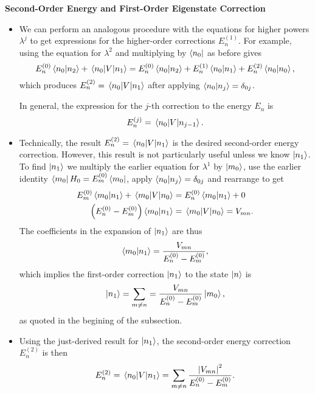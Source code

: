 \documentclass[11pt, a4paper]{article}
\begin{document}
\textbf{Second-Order Energy and First-Order Eigenstate Correction}
\begin{itemize}
     \item We can perform an analogous procedure with the equations for higher powers $ \lambda^{j} $ to get expressions for the higher-order corrections $ E_{n}^{(1)} $. For example, using the equation for $ \lambda^{2} $ and multiplying by $ \bra{n_{0}} $ as before gives
    \begin{equation*}
        E_{n}^{(0)} \braket{n_{0}}{n_{2}} + \mel{n_{0}}{V}{n_{1}} = E_{n}^{(0)}\braket{n_{0}}{n_{2}} + E_{n}^{(1)}\braket{n_{0}}{n_{1}} + E_{n}^{(2)}\braket{n_{0}}{n_{0}}, 
    \end{equation*}
    which produces $ E_{n}^{(2)} = \mel{n_{0}}{V}{n_{1}}$ after applying $ \braket{n_{0}}{n_{j}} = \delta_{0j} $. 

    In general, the expression for the $ j $-th correction to the energy $ E_{n} $ is
    \begin{equation*}
        E_{n}^{(j)} = \mel{n_{0}}{V}{n_{j-1}}.
    \end{equation*}
    
    \item Technically, the result $ E_{n}^{(2)} = \mel{n_{0}}{V}{n_{1}} $ is the desired second-order energy correction. However, this result is not particularly useful unless we know $ \ket{n_{1}} $. To find $ \ket{n_{1}} $ we multiply the earlier equation for $ \lambda^{1} $ by $ \ket{m_{0}} $, use the earlier identity $ \bra{m_{0}}H_{0} = E_{m}^{(0)}\bra{m_{0}} $, apply $ \braket{n_{0}}{n_{j}} = \delta_{0j} $ and rearrange to get
    \begin{align*}
        E_{m}^{(0)}\braket{m_{0}}{n_{1}} + \mel{m_{0}}{V}{n_{0}} &= E_{n}^{(0)} \braket{m_{0}}{n_{1}} + 0\\
        \left( E_{n}^{(0)} - E_{m}^{(0)} \right)\braket{m_{0}}{n_{1}} &= \mel{m_{0}}{V}{n_{0}} = V_{mn}.
    \end{align*}
    The coefficients in the expansion of $ \ket{n_{1}} $ are thus
    \begin{equation*}
        \braket{m_{0}}{n_{1}} = \frac{V_{mn}}{E_{n}^{(0)} - E_{m}^{(0)}},
    \end{equation*}
    which implies the first-order correction $ \ket{n_{1}} $ to the state $ \ket{n} $ is
    \begin{equation*}
        \ket{n_{1}} = \sum_{m\neq n} = \frac{V_{mn}}{E_{n}^{(0)} - E_{m}^{(0)}} \ket{m_{0}},
    \end{equation*}
    as quoted in the begining of the subsection.

    \item Using the just-derived result for $ \ket{n_{1}} $, the second-order energy correction $ E_{n}^{(2)} $ is then
    \begin{equation*}
        E_{n}^{(2)} = \mel{n_{0}}{V}{n_{1}} = \sum_{m \neq n} \frac{\abs{V_{mn}}^{2}}{E_{n}^{(0)} - E_{m}^{(0)}}.
    \end{equation*}

\end{itemize}
\end{document}
